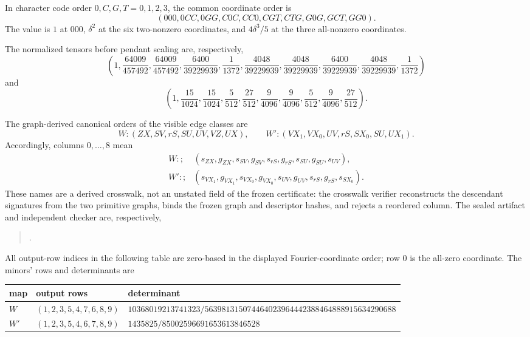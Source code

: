 \documentclass[11pt]{article}
\theoremstyle{remark}
\begin{document}
In character code order \(0,C,G,T=0,1,2,3\), the common coordinate order is
\[
(000,0CC,0GG,C0C,CC0,CGT,CTG,G0G,GCT,GG0).
\]
The value is \(1\) at \(000\), \(\delta^2\) at the six two-nonzero
coordinates, and \(4\delta^3/5\) at the three all-nonzero coordinates.

The normalized tensors before pendant scaling are, respectively,
\[
\left(1,\frac{64009}{457492},\frac{64009}{457492},
\frac{6400}{39229939},\frac1{1372},
\frac{4048}{39229939},\frac{4048}{39229939},
\frac{6400}{39229939},\frac{4048}{39229939},\frac1{1372}\right)
\]
and
\[
\left(1,\frac{15}{1024},\frac{15}{1024},\frac5{512},\frac{27}{512},
\frac9{4096},\frac9{4096},\frac5{512},\frac9{4096},\frac{27}{512}\right).
\]

The graph-derived canonical orders of the visible edge classes are
\[
 W:(ZX,SV,rS,SU,UV,VZ,UX),\qquad
 W':(VX_1,VX_0,UV,rS,SX_0,SU,UX_1).
\]
Accordingly, columns \(0,\ldots,8\) mean
\[
 \begin{aligned}
 W:;&(s_{ZX},g_{ZX},s_{SV},g_{SV},s_{rS},g_{rS},
       s_{SU},g_{SU},s_{UV}),\\
 W':;&(s_{VX_1},g_{VX_1},s_{VX_0},g_{VX_0},s_{UV},g_{UV},
       s_{rS},g_{rS},s_{SX_0}).
 \end{aligned}
\]
These names are a derived crosswalk, not an unstated field of the frozen
certificate: the crosswalk verifier reconstructs the descendant signatures
from the two primitive graphs, binds the frozen graph and descriptor hashes,
and rejects a reordered column.  The sealed artifact and independent checker
are, respectively,
\begin{quote}\small
{}\par
{}.
\end{quote}
All output-row indices in the following table are zero-based in the displayed
Fourier-coordinate order; row \(0\) is the all-zero coordinate.  The minors'
rows and determinants are
\begin{center}
\small
\begin{tabular}{lll}
\toprule
map & output rows & determinant\\
\midrule
\(W\) & \((1,2,3,5,4,7,6,8,9)\)
& \(10368019213741323/
563981315074464023964442388464888915634290688\)\\
\(W'\) & \((1,2,3,5,4,6,7,8,9)\)
& \(1435825/85002596691653613846528\)\\
\bottomrule
\end{tabular}
\end{center}
\end{document}
